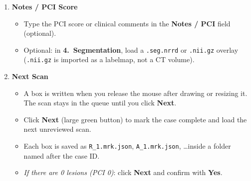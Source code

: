 \documentclass[10pt,a4paper]{article}
\begin{document}
\begin{enumerate}[leftmargin=1.5em, itemsep=1.5pt, topsep=1pt]
    \item \textbf{Notes / PCI Score}
    \begin{itemize}[leftmargin=1.2em, itemsep=0.5pt]
        \item Type the PCI score or clinical comments in the \textbf{Notes / PCI} field (optional).
        \item Optional: in \textbf{4.\ Segmentation}, load a \texttt{.seg.nrrd} or \texttt{.nii.gz} overlay (\texttt{.nii.gz} is imported as a labelmap, not a CT volume).
    \end{itemize}

    \item \textbf{Next Scan}
    \begin{itemize}[leftmargin=1.2em, itemsep=0.5pt]
        \item A box is written when you release the mouse after drawing or resizing it. The scan stays in the queue until you click \textbf{Next}.
        \item Click \textbf{Next} (large green button) to mark the case complete and load the next unreviewed scan.
        \item Each box is saved as \texttt{R\_1.mrk.json}, \texttt{A\_1.mrk.json}, \ldots inside a folder named after the case ID.
        \item \textit{If there are 0 lesions (PCI 0)}: click \textbf{Next} and confirm with \textbf{Yes}.
    \end{itemize}
\end{enumerate}
\end{document}
